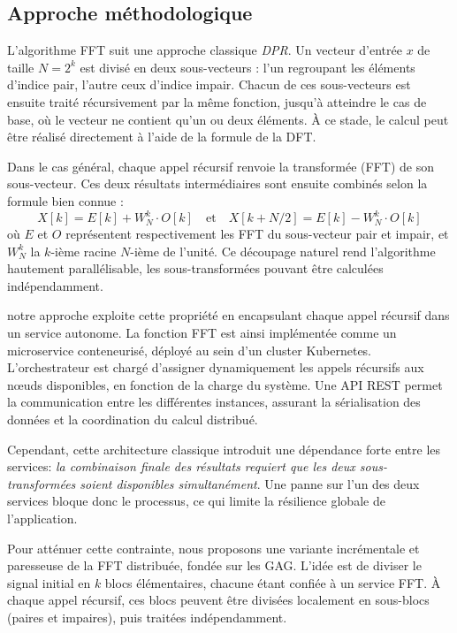 \subsection{Approche méthodologique}{}

L’algorithme FFT suit une approche classique \textit{DPR}. Un vecteur d’entrée $x$ de taille $N = 2^k$ est divisé en deux sous-vecteurs : l’un regroupant les éléments d’indice pair, l’autre ceux d’indice impair. Chacun de ces sous-vecteurs est ensuite traité récursivement par la même fonction, jusqu’à atteindre le cas de base, où le vecteur ne contient qu’un ou deux éléments. À ce stade, le calcul peut être réalisé directement à l’aide de la formule de la DFT.

Dans le cas général, chaque appel récursif renvoie la transformée (FFT) de son sous-vecteur. Ces deux résultats intermédiaires sont ensuite combinés selon la formule bien connue :
\[
X[k] = E[k] + W_N^k \cdot O[k] \quad \text{et} \quad X[k + N/2] = E[k] - W_N^k \cdot O[k]
\]
où $E$ et $O$ représentent respectivement les FFT du sous-vecteur pair et impair, et $W_N^k$ la $k$-ième racine $N$-ième de l’unité. Ce découpage naturel rend l’algorithme hautement parallélisable, les sous-transformées pouvant être calculées indépendamment.

notre approche exploite cette propriété en encapsulant chaque appel récursif dans un service autonome. La fonction FFT est ainsi implémentée comme un microservice conteneurisé, déployé au sein d’un cluster Kubernetes. L’orchestrateur est chargé d’assigner dynamiquement les appels récursifs aux nœuds disponibles, en fonction de la charge du système. Une API REST permet la communication entre les différentes instances, assurant la sérialisation des données et la coordination du calcul distribué.

Cependant, cette architecture classique introduit une dépendance forte entre les services: \textit{la combinaison finale des résultats requiert que les deux sous-transformées soient disponibles simultanément}. Une panne sur l’un des deux services bloque donc le processus, ce qui limite la résilience globale de l’application.

Pour atténuer cette contrainte, nous proposons une variante incrémentale et paresseuse de la FFT distribuée, fondée sur les GAG. L’idée est de diviser le signal initial en $k$ blocs élémentaires, chacune étant confiée à un service FFT. À chaque appel récursif, ces blocs peuvent être divisées localement en sous-blocs (paires et impaires), puis traitées indépendamment.

